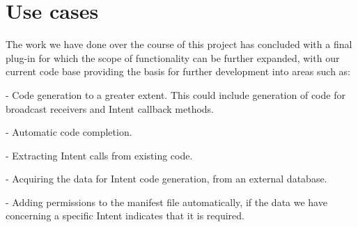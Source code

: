 \section{Use cases}
\label{usecases}

\label{Use cases}
The work we have done over the course of this project has concluded with a final plug-in for which the scope of functionality can be further expanded, with our current code base providing the basis for further development into areas such as:

	- Code generation to a greater extent. This could include generation of code for broadcast receivers and Intent callback methods.

	- Automatic code completion.

	- Extracting Intent calls from existing code.

	- Acquiring the data for Intent code generation, from an external database.

	- Adding permissions to the manifest file automatically, if the data we have concerning a specific Intent indicates that it is required.